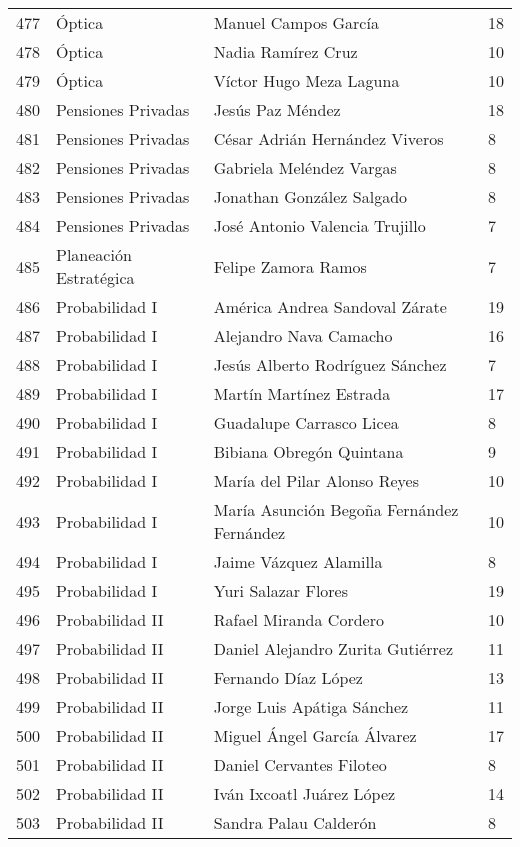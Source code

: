 \begin{table}[ht]
\begin{tabular}{rlll}
  477 & Óptica & Manuel Campos García & 18 \\ 
  478 & Óptica & Nadia Ramírez Cruz & 10 \\ 
  479 & Óptica & Víctor Hugo Meza Laguna & 10 \\ 
  480 & Pensiones Privadas & Jesús Paz Méndez & 18 \\ 
  481 & Pensiones Privadas & César Adrián Hernández Viveros & 8 \\ 
  482 & Pensiones Privadas & Gabriela Meléndez Vargas & 8 \\ 
  483 & Pensiones Privadas & Jonathan González Salgado & 8 \\ 
  484 & Pensiones Privadas & José Antonio Valencia Trujillo & 7 \\ 
  485 & Planeación Estratégica & Felipe Zamora Ramos & 7 \\ 
  486 & Probabilidad I & América Andrea Sandoval Zárate & 19 \\ 
  487 & Probabilidad I & Alejandro Nava Camacho & 16 \\ 
  488 & Probabilidad I & Jesús Alberto Rodríguez Sánchez & 7 \\ 
  489 & Probabilidad I & Martín Martínez Estrada & 17 \\ 
  490 & Probabilidad I & Guadalupe Carrasco Licea & 8 \\ 
  491 & Probabilidad I & Bibiana Obregón Quintana & 9 \\ 
  492 & Probabilidad I & María del Pilar Alonso Reyes & 10 \\ 
  493 & Probabilidad I & María Asunción Begoña Fernández Fernández & 10 \\ 
  494 & Probabilidad I & Jaime Vázquez Alamilla & 8 \\ 
  495 & Probabilidad I & Yuri Salazar Flores & 19 \\ 
  496 & Probabilidad II & Rafael Miranda Cordero & 10 \\ 
  497 & Probabilidad II & Daniel Alejandro Zurita Gutiérrez & 11 \\ 
  498 & Probabilidad II & Fernando Díaz López & 13 \\ 
  499 & Probabilidad II & Jorge Luis Apátiga Sánchez & 11 \\ 
  500 & Probabilidad II & Miguel Ángel García Álvarez & 17 \\ 
  501 & Probabilidad II & Daniel Cervantes Filoteo & 8 \\ 
  502 & Probabilidad II & Iván Ixcoatl Juárez López & 14 \\ 
  503 & Probabilidad II & Sandra Palau Calderón & 8 \\ 

\end{tabular}
\end{table}

